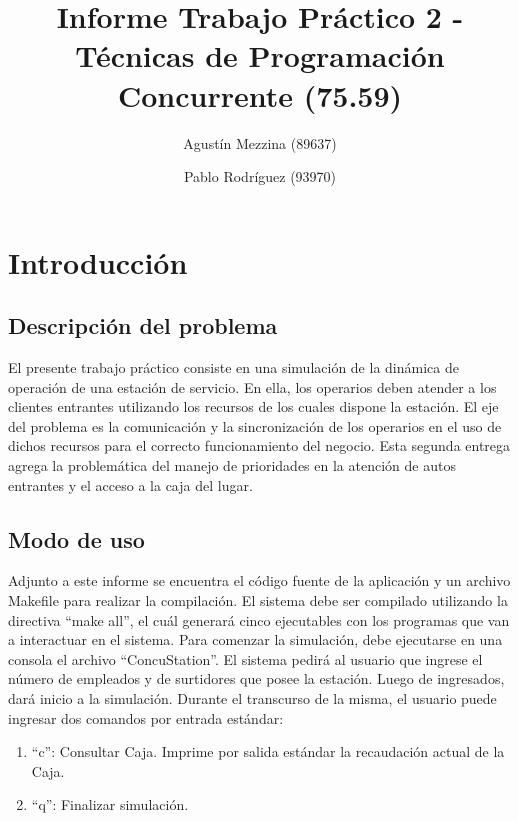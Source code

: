 \documentclass{article}
\begin{document}
\title{Informe Trabajo Práctico 2 - Técnicas de Programación Concurrente (75.59)}
\author{Agustín Mezzina (89637)\\
	\and
        Pablo Rodríguez (93970)}
\maketitle

\tableofcontents
\clearpage

\section{Introducción}
\subsection{Descripción del problema}
El presente trabajo práctico consiste en una simulación de la dinámica de operación de una estación de servicio. En ella, los operarios deben atender a los clientes entrantes utilizando los recursos de los cuales dispone la estación. El eje del problema es la comunicación y la sincronización de los operarios en el uso de dichos recursos para el correcto funcionamiento del negocio.
Esta segunda entrega agrega la problemática del manejo de prioridades en la atención de autos entrantes y el acceso a la caja del lugar.
\subsection{Modo de uso}
Adjunto a este informe se encuentra el código fuente de la aplicación y un archivo Makefile para realizar la compilación. El sistema debe ser compilado utilizando la directiva ``make all'', el cuál generará cinco ejecutables con los programas que van a interactuar en el sistema.
Para comenzar la simulación, debe ejecutarse en una consola el archivo ``ConcuStation''.
El sistema pedirá al usuario que ingrese el número de empleados y de surtidores que posee la estación. Luego de ingresados, dará inicio a la simulación.
Durante el transcurso de la misma, el usuario puede ingresar dos comandos por entrada estándar:
\begin{enumerate}
	\item ``c'': Consultar Caja. Imprime por salida estándar la recaudación actual de la Caja.
	\item ``q'': Finalizar simulación.
\end{enumerate}
\end{document}
